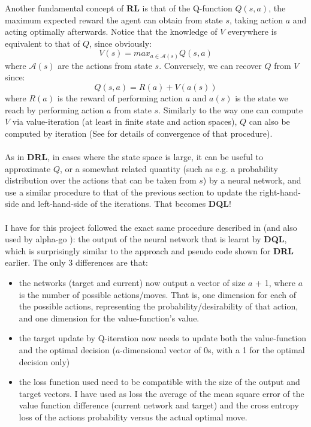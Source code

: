 
\label{sec:TheoryDQL}
Another fundamental concept of \textbf{RL} is that of the Q-function $Q(s, a)$, the maximum expected reward the agent can obtain from state $s$, taking action $a$ and acting optimally afterwards. Notice that the knowledge of $V$ everywhere is equivalent to that of $Q$, since obviously:
\begin{equation} \label{eq:QI}
V(s) = max_{a \in \mathcal{A}(s)} Q(s, a)
\end{equation}
where $\mathcal{A}(s)$ are the actions from state $s$. Conversely, we can recover $Q$ from $V$ since:
\begin{equation} \label{eq:QI2}
Q(s, a) = R(a) + V(a(s))
\end{equation}
where $R(a)$ is the reward of performing action $a$ and $a(s)$ is the state we reach by performing action $a$ from state $s$. Similarly to the way one can compute $V$ via value-iteration (at least in finite state and action spaces), $Q$ can also be computed by iteration (See \cite{Watkins1992} for details of convergence of that procedure).
\\
\\
As in \textbf{DRL}, in cases where the state space is large, it can be useful to approximate $Q$, or a somewhat related quantity (such as e.g. a probability distribution over the actions that can be taken from $s$) by a neural network, and use a similar procedure to that of the previous section to update the right-hand-side and left-hand-side of the iterations. That becomes \textbf{DQL}!
\\
\\
I have for this project followed the exact same procedure described in \cite{https://doi.org/10.48550/arxiv.1805.07470} (and also used by alpha-go \cite{AlphaGo}): the output of the neural network that is learnt by \textbf{DQL}, which is surprisingly similar to the approach and pseudo code shown for \textbf{DRL} earlier. The only 3 differences are that:
\begin{itemize}
\item the networks (target and current) now output a vector of size $a$ + 1, where $a$ is the number of possible actions/moves. That is, one dimension for each of the possible actions, representing the probability/desirability of that action, and one dimension for the value-function's value.
\item the target update by Q-iteration now needs to update both the value-function and the optimal decision ($a$-dimensional vector of 0s, with a 1 for the optimal decision only)
\item the loss function used need to be compatible with the size of the output and target vectors. I have used as loss the average of the mean square error of the value function difference (current network and target) and the cross entropy loss of the actions probability versus the actual optimal move.
\end{itemize}
